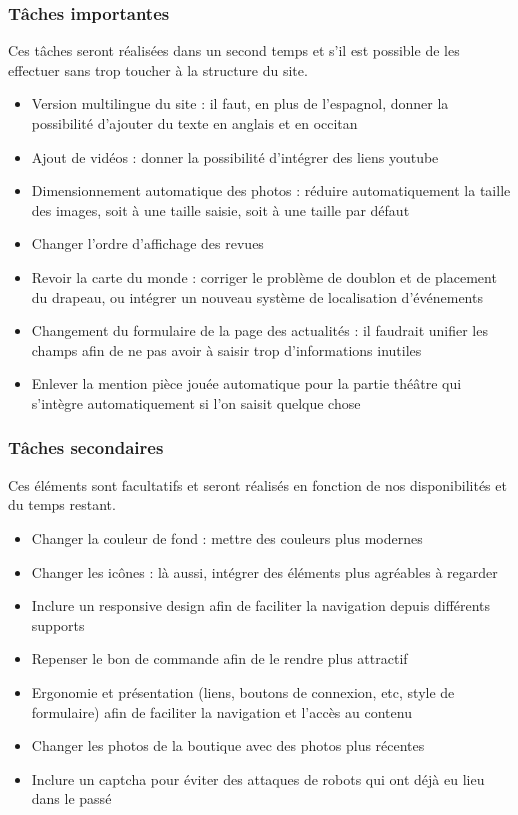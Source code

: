 \documentclass[11pt]{report}
\begin{document}
\subsubsection*{Tâches importantes}
Ces tâches seront réalisées dans un second temps et s'il est possible de les 
effectuer 
sans trop toucher à la structure du site.
\begin{itemize}
\item Version multilingue du site : il faut, en plus de l'espagnol, donner la
possibilité d'ajouter du texte en anglais et en occitan 
\item Ajout de vidéos : donner la possibilité d'intégrer des liens youtube
\item Dimensionnement automatique des photos : réduire automatiquement la
taille des images, soit à une taille saisie, soit à une taille par défaut 
\item Changer l'ordre d'affichage des revues
\item Revoir la carte du monde : corriger le problème de doublon et de
placement du drapeau, ou intégrer un nouveau système de localisation 
d’événements
\item Changement du formulaire de la page des actualités : il faudrait unifier
les champs afin de ne pas avoir à saisir trop d'informations inutiles
\item Enlever la mention \og pièce jouée \fg automatique pour la partie théâtre
qui s'intègre automatiquement si l'on saisit quelque chose
\end{itemize}


\subsubsection*{Tâches secondaires}
Ces éléments sont facultatifs et seront réalisés en fonction de nos 
disponibilités et du temps restant.
\begin{itemize}
\item Changer la couleur de fond : mettre des couleurs plus modernes
\item Changer les icônes : là aussi, intégrer des éléments plus agréables à
regarder
\item Inclure un responsive design afin de faciliter la navigation depuis
différents supports
\item Repenser le bon de commande afin de le rendre plus attractif
\item Ergonomie et présentation (liens, boutons de connexion, etc, style de
formulaire) afin de faciliter la navigation et l'accès au contenu
\item Changer les photos de la boutique avec des photos plus récentes
\item Inclure un captcha pour éviter des attaques de robots qui ont déjà eu lieu
dans le passé
\end{itemize}
\end{document}

